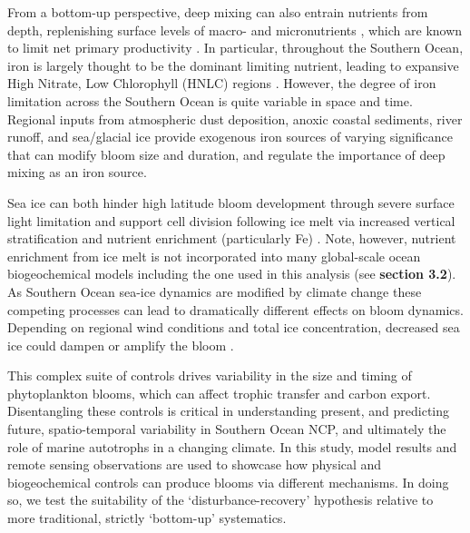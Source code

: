 From a bottom-up perspective, deep mixing can also entrain nutrients from depth, replenishing surface levels of macro- and micronutrients \parencite{CarranzaSouthernOceanwinddriven2015}, which are known to limit net primary productivity \parencite{MooreProcessespatternsoceanic2013}. In particular, throughout the Southern Ocean, iron is largely thought to be the dominant limiting nutrient, leading to expansive High Nitrate, Low Chlorophyll (HNLC) regions \parencite{MartinIrondeficiencylimits1990, deBaarImportanceironplankton1995, deBaarSynthesisironfertilization2005, Boydbiogeochemicalcycleiron2010}. However, the degree of iron limitation across the Southern Ocean is quite variable in space and time. Regional inputs from atmospheric dust deposition, anoxic coastal sediments, river runoff, and sea/glacial ice provide exogenous iron sources of varying significance \parencite{MooreSedimentarymineraldust2008,BoydMappingphytoplanktoniron2012} that can modify bloom size and duration, and regulate the importance of deep mixing as an iron source. 

Sea ice can both hinder high latitude bloom development through severe surface light limitation \parencite{ArrigoSeculartrendsArctic2011} and support cell division following ice melt via increased vertical stratification \parencite{SmithPhytoplanktonbloomproduced1985,SmithInfluenceseaice2008} and nutrient enrichment (particularly Fe) \parencite{SedwickRegulationalgalblooms1997, FennelImpactsironcontrol2003, LancelotSpatialdistributioniron2009}. Note, however, nutrient enrichment from ice melt is not incorporated into many global-scale ocean biogeochemical models including the one used in this analysis (see \textbf{section 3.2}). As Southern Ocean sea-ice dynamics are modified by climate change \parencite{StammerjohnRegionsrapidsea2012} these competing processes can lead to dramatically different effects on bloom dynamics. Depending on regional wind conditions and total ice concentration, decreased sea ice could dampen or amplify the bloom 
\parencite{Montes-HugoRecentchangesphytoplankton2009}. 

This complex suite of controls drives variability in the size \parencite{SullivanDistributionsphytoplanktonblooms1993, MoorePhytoplanktonchlorophylldistributions2000} and timing \parencite{RacaultPhytoplanktonphenologyglobal2012, ThomallaRegionalscalecharacteristics2011} of phytoplankton blooms, which can affect trophic transfer and carbon export. Disentangling these controls is critical in understanding present, and predicting future, spatio-temporal variability in Southern Ocean NCP, and ultimately the role of marine autotrophs in a changing climate. In this study, model results and remote sensing observations are used to showcase how physical and biogeochemical controls can produce blooms via different mechanisms. In doing so, we test the suitability of the `disturbance-recovery' hypothesis relative to more traditional, strictly `bottom-up' systematics.

